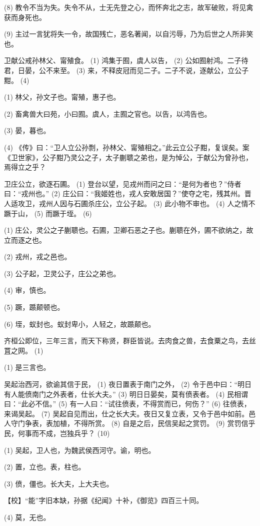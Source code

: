 \documentclass[12pt,UTF8]{ctexbook}
\begin{document}
(8) 教令不当为失。失令不从，士无先登之心，而怀奔北之志，故军破败，将见禽获而身死也。

(9) 主过一言犹将失一令，故国残亡，恶名著闻，以自污辱，乃为后世之人所非笑也。

卫献公戒孙林父、甯殖食。 (1) 鸿集于囿，虞人以告， (2) 公如囿射鸿。二子待君，日晏，公不来至。 (3) 来，不释皮冠而见二子。二子不说，逐献公，立公子黚。 (4)

(1) 林父，孙文子也。甯殖，惠子也。

(2) 畜禽兽大曰苑，小曰囿。虞人，主囿之官也。以告，以鸿告也。

(3) 晏，暮也。

(4) 《传》曰：“卫人立公孙剽，孙林父、甯殖相之。”此云立公子黚，复误矣。案《卫世家》，公子黚乃灵公之子，太子蒯聩之弟也，是为悼公，于献公为曾孙也，焉得立之乎？

卫庄公立，欲逐石圃。 (1) 登台以望，见戎州而问之曰：“是何为者也？”侍者曰：“戎州也。” (2) 庄公曰：“我姬姓也，戎人安敢居国？”使夺之宅，残其州。晋人适攻卫，戎州人因与石圃杀庄公，立公子起。 (3) 此小物不审也。 (4) 人之情不蹶于山， (5) 而蹶于垤。 (6)

(1) 庄公，灵公之子蒯聩也。石圃，卫卿石恶之子也。蒯聩在外，圃不欲纳之，故立而逐之也。

(2) 戎州，戎之邑也。

(3) 公子起，卫灵公子，庄公之弟也。

(4) 审，慎也。

(5) 蹶，踬颠顿也。

(6) 垤，蚁封也。蚁封卑小，人轻之，故踬颠也。

齐桓公即位，三年三言，而天下称贤，群臣皆说。去肉食之兽，去食粟之鸟，去丝罝之网。 (1)

(1) 是三言也。

吴起治西河，欲谕其信于民， (1) 夜日置表于南门之外， (2) 令于邑中曰：“明日有人能偾南门之外表者，仕长大夫。” (3) 明日日晏矣，莫有偾表者。 (4) 民相谓曰：“此必不信。” (5) 有一人曰：“试往偾表，不得赏而已，何伤？” (6) 往偾表，来谒吴起。 (7) 吴起自见而出，仕之长大夫。夜日又复立表，又令于邑中如前。邑人守门争表，表加植，不得所赏。 (8) 自是之后，民信吴起之赏罚。 (9) 赏罚信乎民，何事而不成，岂独兵乎？ (10)

(1) 吴起，卫人也，为魏武侯西河守。谕，明也。

(2) 置，立也。表，柱也。

(3) 偾，僵也。长大夫，上大夫也。

【校】“能”字旧本缺，孙据《纪闻》十补，《御览》四百三十同。

(4) 莫，无也。
\end{document}
